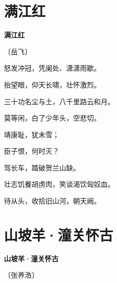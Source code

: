 \documentclass[12pt,UTF-8,openany,fontset=none]{ctexbook}
\begin{document}
\vspace{8pt}
\clearpage

\section{满江红}


\begin{center}
    {\bfseries 满江红}

    \vspace{18pt}

    \begin{large}\xuwen
        〔岳飞〕
    \end{large}

\end{center}

    \vspace{18pt}  %

\begin{center}
    \begin{Large}

        怒发冲冠，凭阑处、潇潇雨歇。

        抬望眼，仰天长啸，壮怀激烈。
        
        三十功名尘与土，八千里路云和月。
        
        莫等闲，白了少年头，空悲切。

        \vspace{18pt}  %

        靖康耻，犹未雪；

        臣子恨，何时灭？

        驾长车，踏破贺兰山缺。

        壮志饥餐胡虏肉，笑谈渴饮匈奴血。

        待从头，收拾旧山河，朝天阙。

    \end{Large}

\end{center}

\vspace{8pt}
\clearpage

\section{山坡羊·潼关怀古}


\begin{center}
    {\bfseries 山坡羊·潼关怀古}

    \vspace{18pt}

    \begin{large}\xuwen
        〔张养浩〕
    \end{large}

\end{center}
\end{document}

